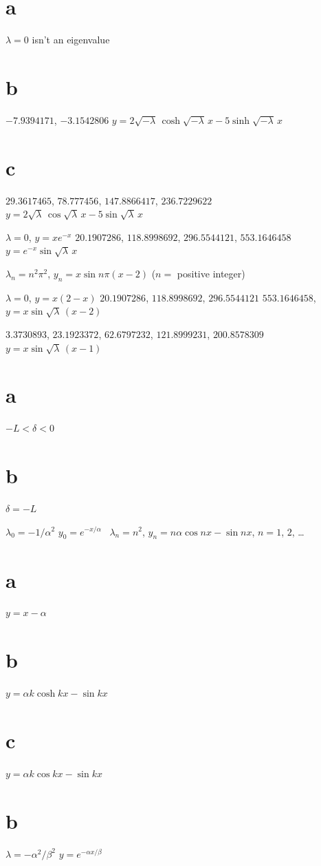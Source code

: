  \part{a} $\lambda=0$ isn't  an eigenvalue\;   \part{b} $-7.9394171$,
$-3.1542806$
$y=2\sqrt{-\lambda}\,\cosh\sqrt{-\lambda}\,x-5\sinh\sqrt{-\lambda}\,x$
\part{c} $29.3617465$, $78.777456$, $147.8866417$,
$236.7229622$
$y=2\sqrt{\lambda}\,\cos\sqrt{\lambda}\,x-5\sin\sqrt{\lambda}\,x$

\smallskip

 $\lambda=0$, $y=xe^{-x}$   $20.1907286$, $118.8998692$,
$296.5544121$,
$553.1646458$
$y=e^{-x}\sin\sqrt{\lambda}\,x$

  $\lambda_{n}=n^{2}\pi^{2}$, $y_{n}=x\sin n\pi(x-2)$\;    ($n=$
positive integer)

\smallskip

 $\lambda=0$, $y=x(2-x)$   $20.1907286$, $118.8998692$, $296.5544121$
$553.1646458$, $y=x\sin\sqrt{\lambda}\,(x-2)$

\smallskip

  $3.3730893$, $23.1923372$, $62.6797232$, $121.8999231$,
$200.8578309$
$y=x\sin\sqrt{\lambda}\,(x-1)$

\smallskip
{} \part{a} $-L<\delta<0$\;   \part{b} $\delta=-L$

 $\lambda_{0}=-1/\alpha^{2}$ $y_{0}=e^{-x/\alpha}$  \,
 $\lambda_{n}=n^{2}$,
$y_{n}=n\alpha \cos nx-\sin nx$,\;   $n=1$, $2$, \dots

\smallskip
{}  \part{a} $y=x-\alpha$ \, \part{b} $y=\alpha k\cosh kx-\sin kx$
\part{c}  $y=\alpha k\cos kx-\sin kx$

\smallskip
{} \part{b} $\lambda=-\alpha^{2}/\beta^{2}$   $y=e^{-\alpha x/\beta}$

